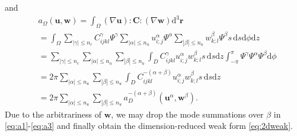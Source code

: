 \documentclass[extra]{gji}
\begin{document}
and
\begin{equation}
  \begin{alignedat}{1}
    & a_{\Omega}\left(\mathbf{u},\mathbf{w}\right)  =
    \int_{\Omega} \left(\nabla\mathbf{u}\right) :\mathbf{C}: \left(\nabla\mathbf{w}\right)
    \text{d}^{3}\mathbf{r} \\&=
    \int_{\Omega} \sum_{|\gamma|\le n_c} C^\gamma_{ijkl} \Psi^\gamma
    \sum_{|\alpha|\le n_u} u_{i;j}^\alpha \Psi^\alpha
    \sum_{|\beta|\le n_u}  w_{k;l}^\beta \Psi^\beta s\,\text{d}s\text{d}\phi \text{d}z \\&=
    \sum_{|\gamma|\le n_c} \sum_{|\alpha|\le n_u} \sum_{|\beta|\le n_u}  
    \int_{D} C^\gamma_{ijkl} u_{i;j}^\alpha w_{k;l}^\beta s\,\text{d}s\text{d}z 
    \int_{-\pi}^{\pi} \Psi^\gamma \Psi^\alpha \Psi^\beta \text{d}\phi\\&=
    2\pi \sum_{|\alpha|\le n_u} \sum_{|\beta|\le n_u} 
    \int_{D} C^{-\left(\alpha+\beta\right)}_{ijkl} u_{i;j}^\alpha w_{k;l}^\beta s\,\text{d}s\text{d}z \\&=
    2\pi \sum_{|\alpha|\le n_u} \sum_{|\beta|\le n_u} 
    a_{D}^{-\left(\alpha+\beta\right)}\left(\mathbf{u}^\alpha,\mathbf{w}^{\beta}\right).
  \end{alignedat}
  \label{eq:a3}
\end{equation}
Due to the arbitrariness of $\mathbf{w}$, we may drop the mode summations 
over $\beta$ in \eqref{eq:a1}-\eqref{eq:a3} and finally obtain
the dimension-reduced weak form \eqref{eq:2dweak}.



\bsp %

\label{lastpage}
\end{document}
